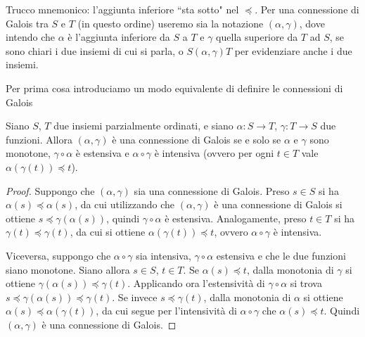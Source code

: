 \documentclass[12pt]{article}
\numberwithin{theorem}{subsection}
\begin{document}
Trucco mnemonico: l'aggiunta inferiore ``sta sotto" nel $\preceq$. Per una connessione di Galois tra $S$ e $T$ (in questo ordine) useremo sia la notazione $(\alpha, \gamma)$, dove intendo che $\alpha$ è l'aggiunta inferiore da $S$ a $T$ e $\gamma$ quella superiore da $T$ ad $S$, se sono chiari i due insiemi di cui si parla, o $S (\alpha, \gamma) T$ per evidenziare anche i due insiemi.

Per prima cosa introduciamo un modo equivalente di definire le connessioni di Galois
\begin{prop}\label{th:galois-conn-extensive}
	Siano $S$, $T$ due insiemi parzialmente ordinati, e siano $\alpha: S \rightarrow T$, $\gamma: T \rightarrow S$ due funzioni.
	Allora $(\alpha, \gamma)$ è una connessione di Galois se e solo se $\alpha$ e $\gamma$ sono monotone, $\gamma \circ \alpha$ è estensiva e $\alpha \circ \gamma$ è intensiva (ovvero per ogni $t \in T$ vale $\alpha(\gamma(t)) \preceq t$).
\end{prop}
\begin{proof}
	Suppongo che $(\alpha, \gamma)$ sia una connessione di Galois.
	Preso $s \in S$ si ha $\alpha(s) \preceq \alpha(s)$, da cui utilizzando che $(\alpha, \gamma)$ è una connessione di Galois si ottiene $s \preceq \gamma(\alpha(s))$, quindi $\gamma \circ \alpha$ è estensiva.
	Analogamente, preso $t \in T$ si ha $\gamma(t) \preceq \gamma(t)$, da cui si ottiene $\alpha(\gamma(t)) \preceq t$, ovvero $\alpha \circ \gamma$ è intensiva.
	
	Viceversa, suppongo che $\alpha \circ \gamma$ sia intensiva, $\gamma \circ \alpha$ estensiva e che le due funzioni siano monotone. Siano allora $s \in S$, $t \in T$.
	Se $\alpha(s) \preceq t$, dalla monotonia di $\gamma$ si ottiene $\gamma(\alpha(s)) \preceq \gamma(t)$. Applicando ora l'estensività di $\gamma \circ \alpha$ si trova $s \preceq \gamma(\alpha(s)) \preceq \gamma(t)$.
	Se invece $s \preceq \gamma(t)$, dalla monotonia di $\alpha$ si ottiene $\alpha(s) \preceq \alpha(\gamma(t))$, da cui segue per l'intensività di $\alpha \circ \gamma$ che $\alpha(s) \preceq t$.
	Quindi $(\alpha, \gamma)$ è una connessione di Galois.
\end{proof}
\end{document}

